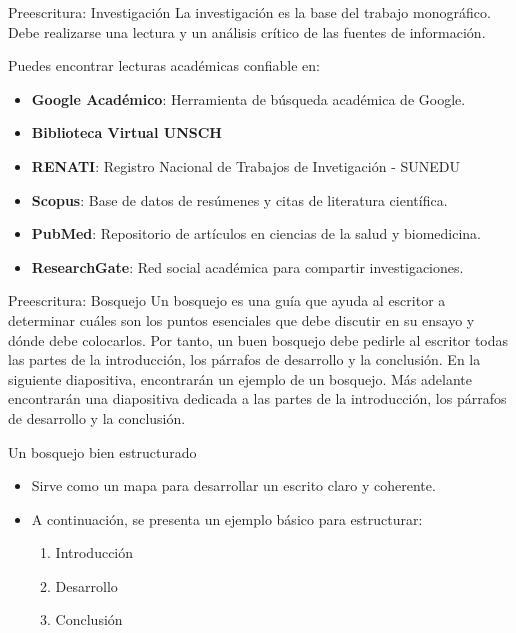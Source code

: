 \documentclass[
11pt, %
]{beamer}
\begin{document}
\begin{frame}{Preescritura: Investigación}
	La investigación es la base del trabajo monográfico. Debe
	realizarse una lectura y un análisis crítico de las fuentes de
	información.

	\vspace{0.5cm}

	Puedes encontrar lecturas académicas confiable en:
	\begin{itemize}
		\item \textbf{Google Académico}: Herramienta de búsqueda académica de Google.
		\item \textbf{Biblioteca Virtual UNSCH}
		\item \textbf{RENATI}: Registro Nacional de Trabajos de Invetigación - 	SUNEDU
		\item \textbf{Scopus}: Base de datos de resúmenes y citas de literatura científica.
		\item \textbf{PubMed}: Repositorio de artículos en ciencias de la salud y biomedicina.
		\item \textbf{ResearchGate}: Red social académica para compartir investigaciones.
	\end{itemize}
\end{frame}

\begin{frame}{Preescritura: Bosquejo}
	Un bosquejo es una guía que ayuda al escritor a determinar cuáles
	son los puntos esenciales que debe discutir en su ensayo y dónde
	debe colocarlos. Por tanto, un buen bosquejo debe pedirle al
	escritor todas las partes de la introducción, los párrafos de
	desarrollo y la conclusión. En la siguiente diapositiva, encontrarán
	un ejemplo de un bosquejo. Más adelante encontrarán una
	diapositiva dedicada a las partes de la introducción, los párrafos de
	desarrollo y la conclusión.
\end{frame}

\begin{frame}{Un bosquejo bien estructurado}
	\begin{itemize}
		\item Sirve como un mapa para desarrollar un escrito claro y coherente.
		\item A continuación, se presenta un ejemplo básico para estructurar:
		      \begin{enumerate}
			      \item Introducción
			      \item Desarrollo
			      \item Conclusión
		      \end{enumerate}
	\end{itemize}
\end{frame}
\end{document}
